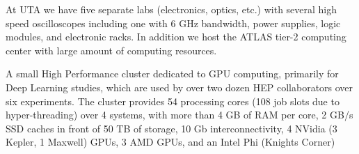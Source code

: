 
At UTA we have five separate labs (electronics, optics, etc.) with several high speed oscilloscopes including one with 6 GHz bandwidth, power supplies, logic modules, and electronic racks. In addition we host the ATLAS tier-2 computing center with large amount of computing resources.

A small High Performance cluster dedicated to                                                                                                              
GPU computing, primarily for Deep Learning studies, which are used by
over two dozen HEP collaborators over six experiments. The cluster
provides 54 processing cores (108 job slots due to hyper-threading) 
over 4 systems, with more than 4 GB of RAM per core, 2 GB/s SSD caches
in front of 50 TB of storage, 10 Gb interconnectivity, 4 NVidia (3 
Kepler, 1 Maxwell) GPUs, 3 AMD GPUs, and an Intel Phi (Knights
Corner)


